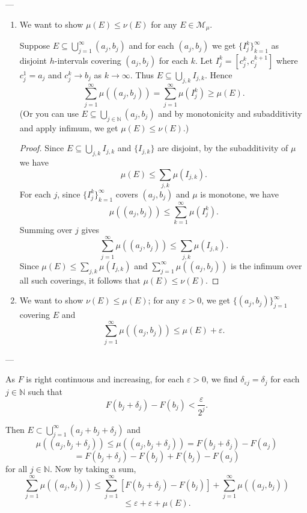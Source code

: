 \documentclass[11pt]{article}
\theoremstyle{definition}
\theoremstyle{remark}
\begin{document}
---

\begin{enumerate}
    \item We want to show $\mu(E) \leq \nu(E)$ for any $E \in \mathcal{M}_\mu$.

    Suppose $E \subseteq \bigcup_{j=1}^\infty (a_j, b_j)$ and for each $(a_j, b_j)$ we get $\{I_j^k\}_{k=1}^\infty$ as disjoint $h$-intervals covering $(a_j, b_j)$ for each $k$. Let $I_j^k = [c_j^k, c_{j}^{k+1}]$ where $c_j^1 = a_j$ and $c_j^k \to b_j$ as $k \to \infty$. Thus $E \subseteq \bigcup_{j,k} I_{j,k}$. Hence
    \[
    \sum_{j=1}^\infty \mu((a_j, b_j)) = \sum_{j=1}^\infty \mu(I_j^k) \geq \mu(E).
    \]
    (Or you can use $E \subseteq \bigcup_{j \in \mathbb{N}} (a_j, b_j)$ and by monotonicity and subadditivity and apply infimum, we get $\mu(E) \leq \nu(E)$.)

    \begin{proof}
    Since $E \subseteq \bigcup_{j,k} I_{j,k}$ and $\{I_{j,k}\}$ are disjoint, by the subadditivity of $\mu$ we have
    \[
    \mu(E) \leq \sum_{j,k} \mu(I_{j,k}).
    \]
    For each $j$, since $\{I_j^k\}_{k=1}^\infty$ covers $(a_j, b_j)$ and $\mu$ is monotone, we have
    \[
    \mu((a_j, b_j)) \leq \sum_{k=1}^\infty \mu(I_j^k).
    \]
    Summing over $j$ gives
    \[
    \sum_{j=1}^\infty \mu((a_j, b_j)) \leq \sum_{j,k} \mu(I_{j,k}).
    \]
    Since $\mu(E) \leq \sum_{j,k} \mu(I_{j,k})$ and $\sum_{j=1}^\infty \mu((a_j, b_j))$ is the infimum over all such coverings, it follows that $\mu(E) \leq \nu(E)$.
    \end{proof}

    \item We want to show $\nu(E) \leq \mu(E)$; for any $\varepsilon > 0$, we get $\{ (a_j, b_j) \}_{j=1}^\infty$ covering $E$ and
    \[
    \sum_{j=1}^\infty \mu((a_j, b_j)) \leq \mu(E) + \varepsilon.
    \]
\end{enumerate}

---

As $F$ is right continuous and increasing, for each $\varepsilon > 0$, we find $\delta_{\varepsilon j} = \delta_j$ for each $j \in \mathbb{N}$ such that
\[ F(b_j + \delta_j) - F(b_j) < \frac{\varepsilon}{2^j}. \]

Then $E \subset \bigcup_{j=1}^\infty (a_j + b_j + \delta_j)$ and
\[
\mu((a_j, b_j + \delta_j)) \leq \mu((a_j, b_j + \delta_j)) = F(b_j + \delta_j) - F(a_j)
\]
\[
= F(b_j + \delta_j) - F(b_j) + F(b_j) - F(a_j)
\]
for all $j \in \mathbb{N}$. Now by taking a sum,
\[
\sum_{j=1}^\infty \mu((a_j, b_j)) \leq \sum_{j=1}^\infty \left[ F(b_j + \delta_j) - F(b_j) \right] + \sum_{j=1}^\infty \mu((a_j, b_j))
\]
\[
\leq \varepsilon + \varepsilon + \mu(E).
\]
\end{document}
